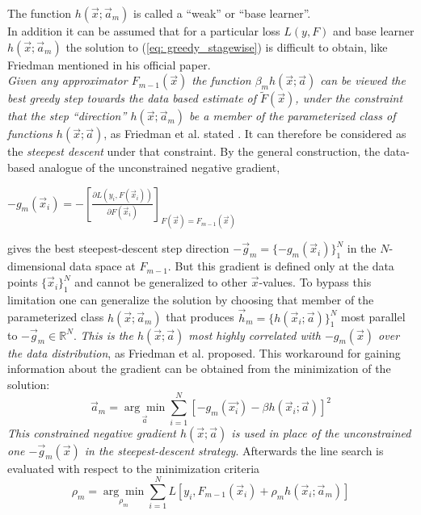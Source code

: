\documentclass[12pt, a4paper]{article}
\begin{document}
The function $h(\vec{x};\vec{a}_m)$ is called a ``weak'' or ``base learner''. \\
In addition it can be assumed that for a particular loss $L(y,F)$ and base learner $h(\vec{x};\vec{a}_m)$ the solution to (\ref{eq: greedy_stagewise}) is difficult to obtain, like Friedman mentioned in his official paper.
\\
\textit{Given any approximator $F_{m-1}(\vec{x})$ the function $\beta_m h(\vec{x};\vec{a})$ can be viewed the best greedy step towards the data based estimate of $\tilde{F}(\vec{x})$, under the constraint that the step ``direction'' $h(\vec{x};\vec{a}_m)$ be a member of the parameterized class of functions $h(\vec{x};\vec{a})$}, as Friedman et al. stated \cite{Friedman2001}. It can therefore be considered as the \textit{steepest descent} under that constraint. By the general construction, the data-based analogue of the unconstrained negative gradient,
\begin{center}
    $- g_m(\vec{x}_i) = - [\frac{\partial L(y_i, F(\vec{x}_i))}{\partial F(\vec{x}_i)}]_{F(\vec{x}) = F_{m-1}(\vec{x})}$
\end{center}
gives the best steepest-descent step direction $-\vec{g}_m = \{-g_m(\vec{x}_i)\}_1^N$ in the $N$-dimensional data space at $F_{m-1}$.
But this gradient is defined only at the data points $\{\vec{x}_i\}_1^N$ and cannot be generalized to other $\vec{x}$-values.
To bypass this limitation one can generalize the solution by choosing that member of the parameterized class $h(\vec{x};\vec{a}_m)$ that produces $\vec{h}_{m} = \{h(\vec{x}_i ;\vec{a})\}_1^N$ most parallel to $-\vec{g}_m \in \mathbb{R}^N$. \textit{This is the $h(\vec{x};\vec{a})$ most highly correlated with $- g_m(\vec{x})$ over the data distribution}, as Friedman et al. \cite{Friedman2001} proposed. This workaround for gaining information about the gradient can be obtained from the minimization of the solution:
\begin{equation}
    \vec{a}_m = \underset{ \vec{a}}{\arg\min}
    \sum_{i=1}^N [- g_{m}(\vec{x_i}) - \beta h(\vec{x}_i;\vec{a})]^2
\end{equation}
\textit{This constrained negative gradient $h(\vec{x};\vec{a})$ is used in place of the unconstrained one $-\vec{g}_m(\vec{x})$ in the steepest-descent strategy}. Afterwards the line search is evaluated with respect to the minimization criteria
\begin{equation}
        \rho_m = \underset{\rho_m}{\arg\min} \sum_{i=1}^N L[y_i,F_{m-1}(\vec{x}_i) + \rho_m h(\vec{x}_i;\vec{a}_m)]
\end{equation}
\end{document}
